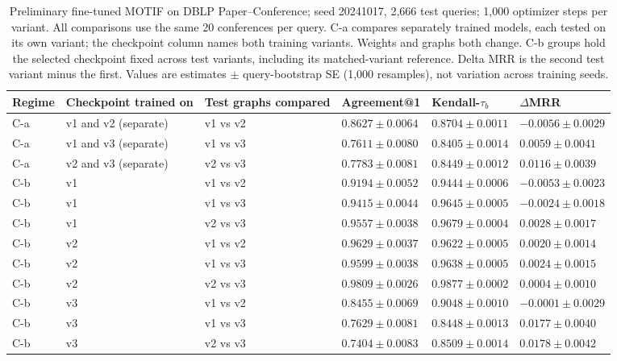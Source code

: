\begin{table}[htbp]
\centering
\small
\renewcommand{\arraystretch}{1.15}
\setlength{\tabcolsep}{5pt}
\begin{adjustbox}{max width=\linewidth}
\begin{tabular}{|l|l|l|l|l|l|}
\hline
\textbf{Regime} & \textbf{Checkpoint trained on} & \textbf{Test graphs compared} & \textbf{Agreement@1} & \textbf{Kendall-$\tau_b$} & \textbf{$\Delta$MRR} \\
\hline
C-a & v1 and v2 (separate) & v1 vs v2 & $0.8627 \pm 0.0064$ & $0.8704 \pm 0.0011$ & $-0.0056 \pm 0.0029$ \\
\hline
C-a & v1 and v3 (separate) & v1 vs v3 & $0.7611 \pm 0.0080$ & $0.8405 \pm 0.0014$ & $0.0059 \pm 0.0041$ \\
\hline
C-a & v2 and v3 (separate) & v2 vs v3 & $0.7783 \pm 0.0081$ & $0.8449 \pm 0.0012$ & $0.0116 \pm 0.0039$ \\
\hline
C-b & v1 & v1 vs v2 & $0.9194 \pm 0.0052$ & $0.9444 \pm 0.0006$ & $-0.0053 \pm 0.0023$ \\
\hline
C-b & v1 & v1 vs v3 & $0.9415 \pm 0.0044$ & $0.9645 \pm 0.0005$ & $-0.0024 \pm 0.0018$ \\
\hline
C-b & v1 & v2 vs v3 & $0.9557 \pm 0.0038$ & $0.9679 \pm 0.0004$ & $0.0028 \pm 0.0017$ \\
\hline
C-b & v2 & v1 vs v2 & $0.9629 \pm 0.0037$ & $0.9622 \pm 0.0005$ & $0.0020 \pm 0.0014$ \\
\hline
C-b & v2 & v1 vs v3 & $0.9599 \pm 0.0038$ & $0.9638 \pm 0.0005$ & $0.0024 \pm 0.0015$ \\
\hline
C-b & v2 & v2 vs v3 & $0.9809 \pm 0.0026$ & $0.9877 \pm 0.0002$ & $0.0004 \pm 0.0010$ \\
\hline
C-b & v3 & v1 vs v2 & $0.8455 \pm 0.0069$ & $0.9048 \pm 0.0010$ & $-0.0001 \pm 0.0029$ \\
\hline
C-b & v3 & v1 vs v3 & $0.7629 \pm 0.0081$ & $0.8448 \pm 0.0013$ & $0.0177 \pm 0.0040$ \\
\hline
C-b & v3 & v2 vs v3 & $0.7404 \pm 0.0083$ & $0.8509 \pm 0.0014$ & $0.0178 \pm 0.0042$ \\
\hline
\end{tabular}
\end{adjustbox}
\caption{Preliminary fine-tuned MOTIF on DBLP Paper--Conference; seed 20241017, 2,666 test queries; 1,000 optimizer steps per variant. All comparisons use the same 20 conferences per query. C-a compares separately trained models, each tested on its own variant; the checkpoint column names both training variants. Weights and graphs both change. C-b groups hold the selected checkpoint fixed across test variants, including its matched-variant reference. Delta MRR is the second test variant minus the first. Values are estimates $\pm$ query-bootstrap SE (1,000 resamples), not variation across training seeds.}
\label{tab:motif-dblp-matrix-invariance}
\end{table}
